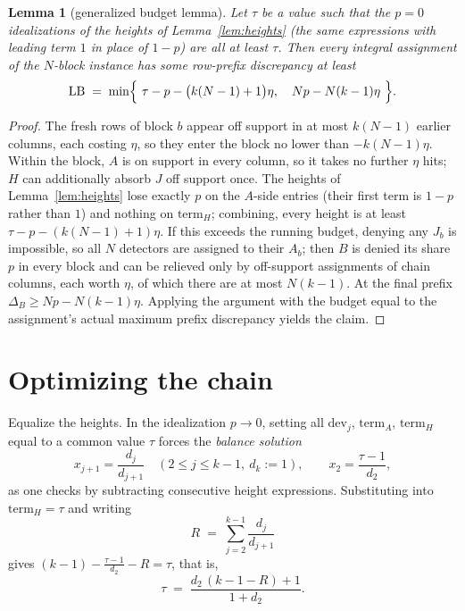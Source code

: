 \documentclass[11pt]{article}
\newtheorem{lemma}[theorem]{Lemma}
\theoremstyle{definition}
\newcommand{\disc}{\Delta}
\begin{document}
\begin{lemma}[generalized budget lemma]\label{lem:budget}
Let $\tau$ be a value such that the $p=0$ idealizations of the heights of
Lemma~\ref{lem:heights} (the same expressions with leading term $1$ in
place of $1-p$) are all at least $\tau$.  Then every integral assignment
of the $N$-block instance has some row-prefix discrepancy at least
\[
 \mathrm{LB}\;=\;\min\Bigl\{\ \tau-p-\bigl(k(N-1)+1\bigr)\eta,\quad
 Np-N(k-1)\eta\ \Bigr\}.
\]
\end{lemma}

\begin{proof}
The fresh rows of block $b$ appear off support in at most $k(N-1)$ earlier
columns, each costing $\eta$, so they enter the block no lower than
$-k(N-1)\eta$.  Within the block, $A$ is on support in every column, so it
takes no further $\eta$ hits; $H$ can additionally absorb $J$ off support
once.  The heights of Lemma~\ref{lem:heights} lose exactly $p$ on the
$A$-side entries (their first term is $1-p$ rather than $1$) and nothing
on $\mathrm{term}_H$; combining, every height is at least
$\tau-p-(k(N-1)+1)\eta$.  If this exceeds the running budget, denying any
$J_b$ is impossible, so all $N$ detectors are assigned to their $A_b$;
then $B$ is denied its share $p$ in every block and can be relieved only
by off-support assignments of chain columns, each worth $\eta$, of which
there are at most $N(k-1)$.  At the final prefix
$\disc_B\ge Np-N(k-1)\eta$.  Applying the argument with the budget equal
to the assignment's actual maximum prefix discrepancy yields the claim.
\end{proof}

\section{Optimizing the chain}\label{sec:optimize}

Equalize the heights.  In the idealization $p\to0$, setting all
$\mathrm{dev}_j$, $\mathrm{term}_A$, $\mathrm{term}_H$ equal to a common
value $\tau$ forces the \emph{balance solution}
\begin{equation}\label{eq:balance}
 x_{j+1}=\frac{d_j}{d_{j+1}}\quad(2\le j\le k-1,\ d_k:=1),
 \qquad
 x_2=\frac{\tau-1}{d_2},
\end{equation}
as one checks by subtracting consecutive height expressions.  Substituting
into $\mathrm{term}_H=\tau$ and writing
\[
 R\;=\;\sum_{j=2}^{k-1}\frac{d_j}{d_{j+1}}
\]
gives $(k-1)-\frac{\tau-1}{d_2}-R=\tau$, that is,
\begin{equation}\label{eq:tau}
 \tau\;=\;\frac{d_2\,(k-1-R)+1}{1+d_2}.
\end{equation}
\end{document}
